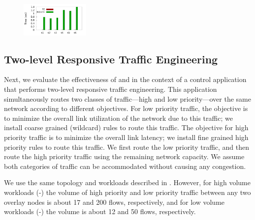 
\begin{figure}[!tb]
\centering
{}
\vspace{-1em}
\label{failoverResults}
\end{figure}

\begin{figure}
\centering
\includegraphics[width=0.3\textwidth]{figs/fe_ro_runtime.pdf}
\label{runtime}
\end{figure}

\subsection{Two-level Responsive Traffic Engineering} 
Next, we evaluate the effectiveness of \FE and \RO in the
context of a control application that performs two-level responsive traffic
engineering. This application simultaneously routes two classes of
traffic---high and low priority---over the same network according to
different objectives. For low priority traffic, the objective is to minimize
the overall link utilization of the network due to this traffic; we install
coarse grained (wildcard) rules to route this traffic.  The objective for
high priority traffic is to minimize the overall link latency; we install
fine grained high priority rules to route this traffic. We first route the
low priority traffic, and then route the high priority traffic using the
remaining network capacity. We assume both categories of traffic can be
accommodated without causing any congestion. 

We use the same topology and workloads described in .
However, for high volume workloads (\sD-\sF) the volume of high priority and
low priority traffic between any two overlay nodes is about 17 and 200 flows,
respectively, and for low volume workloads (\sA-\sC) the volume is about 12
and 50 flows, respectively.


